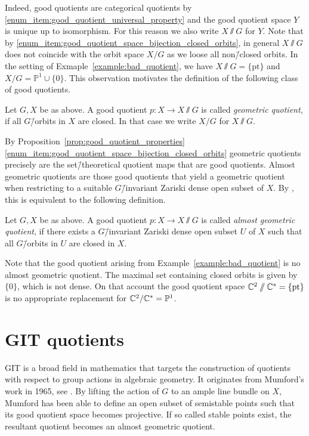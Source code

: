 Indeed, good quotients are categorical quotients by \ref{enum_item:good_quotient_universal_property} and the good quotient space $Y$ is unique up to isomorphism. For this reason we also write $X\sslash G$ for $Y$.
%
Note that by \ref{enum_item:good_quotient_space_bijection_closed_orbits}, in general $X\sslash G$ does not coincide with the orbit space $X / G$ as we loose all non\=/closed orbits. In the setting of Exmaple~\ref{example:bad_quotient}, we have $X\sslash G = \{\text{pt}\}$ and $X/G = \mathbb{P}^1 \cup \{0\}$. This observation motivates the definition of the following class of good quotients.

\begin{defi}
	Let $G, X$ be as above. A good quotient $p\colon X \rightarrow X\sslash G$ is called \emph{geometric quotient}, if all $G$\=/orbits in $X$ are closed. In that case we write $X/G$ for $X\sslash G$.
\end{defi}

By Proposition~\ref{prop:good_quotient_properties}\ref{enum_item:good_quotient_space_bijection_closed_orbits} geometric quotients precisely are the set\=/theoretical quotient maps that are good quotients. Almost geometric quotients are those good quotients that yield a geometric quotient when restricting to a suitable $G$\=/invariant Zariski dense open subset of $X$. By \cite[Proposition 5.0.11]{cls}, this is equivalent to the following definition.

\begin{defi}
	Let $G, X$ be as above. A good quotient $p\colon X \rightarrow X\sslash G$ is called \emph{almost geometric quotient}, if there exists a $G$\=/invariant Zariski dense open subset $U$ of $X$ such that all $G$\=/orbits in $U$ are closed in $X$.
\end{defi}

Note that the good quotient arising from Example~\ref{example:bad_quotient} is no almost geometric quotient. The maximal set containing closed orbits is given by $\{0\}$, which is not dense. On that account the good quotient space $\mathbb{C}^2 \sslash \mathbb{C}^* = \{\text{pt}\}$ is no appropriate replacement for $\mathbb{C}^2/\mathbb{C}^* = \mathbb{P}^1$.

\section{GIT quotients}
\ac{GIT} is a broad field in mathematics that targets the construction of quotients with respect to group actions in algebraic geometry. It originates from Mumford's work in 1965, see \cite{git}. By lifting the action of $G$ to an ample line bundle on $X$, Mumford has been able to define an open subset of semistable points such that its good quotient space becomes projective. If so called stable points exist, the resultant quotient becomes an almost geometric quotient.

